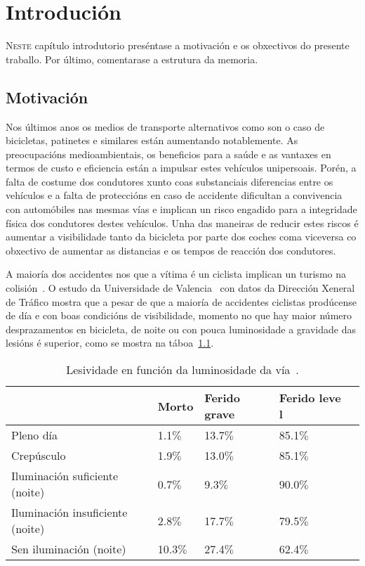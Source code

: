 \chapter{Introdución}
\label{chap:introducion}

\lettrine{N}{este} capítulo introdutorio preséntase a motivación e os obxectivos do presente traballo.
Por último, comentarase a estrutura da memoria.

\section{Motivación}

Nos últimos anos os medios de transporte alternativos como son o caso de bicicletas, patinetes e similares están aumentando notablemente. As preocupacións medioambientais, os beneficios para a saúde e as vantaxes en termos de custo e eficiencia están a impulsar estes vehículos unipersoais. Porén, a falta de costume dos condutores xunto coas substanciais diferencias entre os vehículos e a falta de proteccións en caso de accidente dificultan a convivencia con automóbiles nas mesmas vías e implican un risco engadido para a integridade física dos condutores destes vehículos. Unha das maneiras de reducir estes riscos é aumentar a visibilidade tanto da bicicleta por parte dos coches coma viceversa co obxectivo de aumentar as distancias e os tempos de reacción dos condutores.

A maioría dos accidentes nos que a vítima é un ciclista implican un turismo na colisión~\cite{PrincipalesCifrasSiniestralidad}.
O estudo da Universidade de Valencia~\cite{ESTUDIOANALISISSINIESTRALIDAD} con datos da Dirección Xeneral de Tráfico mostra que a pesar de que a maioría de accidentes ciclistas prodúcense de día e con boas condicións de visibilidade, momento no que hay maior número desprazamentos en bicicleta, de noite ou con pouca luminosidade a gravidade das lesións é superior, como se mostra na táboa~\ref{tab:lesividade}.


\begin{table}[tbp]
  \caption{Lesividade en función da luminosidade da vía~\cite{ESTUDIOANALISISSINIESTRALIDAD}. }
  \label{tab:lesividade}
    \begin{center}
        \begin{tabular}{|l|l|l|l|l|}
            \hline
             & Morto & Ferido grave & Ferido leve l\\ \hline
             Pleno día & 1.1\(\%\)& 13.7\(\%\) & 85.1\(\%\)\\ \hline
             Crepúsculo & 1.9\(\%\) & 13.0\(\%\) &85.1\(\%\) \\ \hline
             Iluminación suficiente (noite) &0.7\(\%\) &9.3\(\%\) &90.0\(\%\)  \\ \hline
             Iluminación insuficiente (noite)  & 2.8\(\%\)& 17.7\(\%\)& 79.5\(\%\)\\ \hline
             Sen iluminación (noite) & 10.3\(\%\)& 27.4\(\%\)&62.4\(\%\) \\ \hline
        \end{tabular}
    \end{center}

\end{table}

